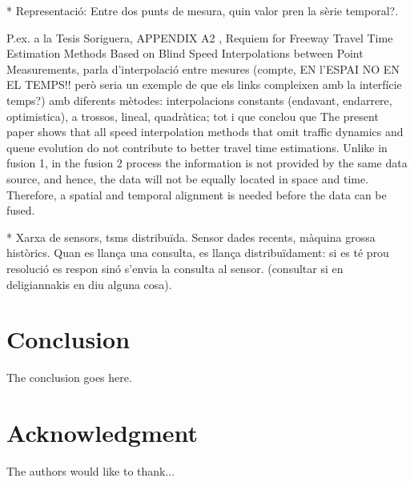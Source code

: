 \documentclass{acm_proc_article-sp}
\begin{document}
* Representació: Entre dos punts de mesura, quin valor pren la sèrie temporal?.





 P.ex. a la Tesis Soriguera, APPENDIX A2 , 
Requiem for Freeway Travel Time Estimation Methods Based
on Blind Speed Interpolations between Point Measurements, parla d'interpolació entre mesures (compte, EN l'ESPAI NO EN EL TEMPS!! però seria un exemple de que els links compleixen amb la interfície temps?) amb diferents mètodes:  interpolacions constants (endavant, endarrere, optimistica), a trossos, lineal, quadràtica;    tot i que conclou que The present paper shows that all speed interpolation methods that omit traffic
dynamics and queue evolution do not contribute to better travel time estimations. 
Unlike in fusion 1, in the fusion 2 process the information is not provided by the same
data source, and hence, the data will not be equally located in space and time. 
Therefore, a spatial and temporal alignment is needed before the data can be fused.


* Xarxa de sensors, tsms distribuïda. Sensor dades recents, màquina grossa històrics. Quan es llança una consulta, es llança distribuïdament: si es té prou resolució es respon sinó s'envia la consulta al sensor. (consultar si en deligiannakis en diu alguna cosa).



\newpage

\mbox{}

\newpage





\section{Conclusion}
The conclusion goes here.


\section*{Acknowledgment}


The authors would like to thank...
\end{document}
